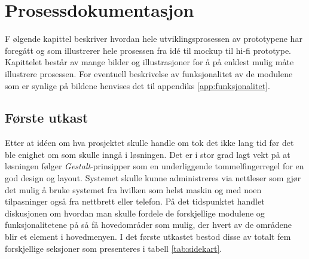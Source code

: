\chapter{Prosessdokumentasjon}
\lettrine[lines=2]{F}{} ølgende kapittel beskriver hvordan hele utviklingsprosessen av prototypene har foregått og som illustrerer hele prosessen fra idé til mockup til hi-fi prototype. Kapittelet består av mange bilder og illustrasjoner for å på enklest mulig måte illustrere prosessen. For eventuell beskrivelse av funksjonalitet av de modulene som er synlige på bildene henvises det til appendiks \ref{app:funksjonalitet}.




\section{Første utkast} \label{sec:utkast}
Etter at idéen om hva prosjektet skulle handle om tok det ikke lang tid før det ble enighet om som skulle inngå i løsningen. Det er i stor grad lagt vekt på at løsningen følger \textit{Gestalt}-prinsipper som en underliggende tommelfingerregel for en god design og layout.
Systemet skulle kunne administreres via nettleser som gjør det mulig å bruke systemet fra hvilken som helst maskin og med noen tilpasninger også fra nettbrett eller telefon.
På det tidspunktet handlet diskusjonen om hvordan man skulle fordele de forskjellige modulene og funksjonalitetene på så få hovedområder som mulig, der hvert av de områdene blir et element i hovedmenyen. 
I det første utkastet bestod disse av totalt fem forskjellige seksjoner som presenteres i tabell \ref{tab:sidekart}.
